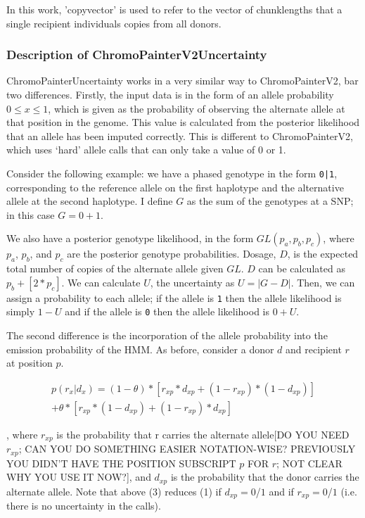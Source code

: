 In this work, 'copyvector' is used to refer to the vector of chunklengths that a single recipient individuals copies from all donors.

\subsubsection{Description of ChromoPainterV2Uncertainty}

ChromoPainterUncertainty works in a very similar way to ChromoPainterV2, bar two differences. Firstly, the input data is in the form of an allele probability $0 \leq x \leq 1$, which is given as the probability of observing the alternate allele at that position in the genome. This value is calculated from the posterior likelihood that an allele has been imputed correctly. This is different to ChromoPainterV2, which uses `hard' allele calls that can only take a value of 0 or 1.

Consider the following example: we have a phased genotype in the form \texttt{0|1}, corresponding to the reference allele on the first haplotype and the alternative allele at the second haplotype. I define $G$ as the sum of the genotypes at a SNP; in this case $G=0+1$.

We also have a posterior genotype likelihood, in the form $GL(p_{a}, p_{b}, p_{c})$, where $p_{a}$, $p_{b}$, and $p_{c}$ are the posterior genotype probabilities. Dosage, $D$, is the expected total number of copies of the alternate allele given $GL$. $D$ can be calculated as $p_{b} + [2*p_{c}]$. We can calculate $U$, the uncertainty as $U = |G-D|$. Then, we can assign a probability to each allele; if the allele is \texttt{1} then the allele likelihood is simply $1 - U$ and if the allele is \texttt{0} then the allele likelihood is $0 + U$.
                 
The second difference is the incorporation of the allele probability into the emission probability of the HMM. As before, consider a donor $d$ and recipient $r$ at position $p$.

\begin{equation}
\begin{split}
p(r_{x} | d_{x}) = (1-\theta)*[r_{xp}*d_{xp} + (1-r_{xp}) * (1-d_{xp})] \\ + \theta * [r_{xp}*(1-d_{xp}) + (1-r_{xp})*d_{xp}]
\end{split}
\end{equation}

, where  $r_{xp}$ is the probability that r carries the alternate allele{\color{red}[DO YOU NEED $r_{xp}$; CAN YOU DO SOMETHING EASIER NOTATION-WISE? PREVIOUSLY YOU DIDN'T HAVE THE POSITION SUBSCRIPT $p$ FOR $r$; NOT CLEAR WHY YOU USE IT NOW?]}, and $d_{xp}$ is the probability that the donor carries the alternate allele. Note that above (3) reduces (1) if $d_{xp} = 0$/$1$ and if $r_{xp} = 0$/$1$ (i.e. there is no uncertainty in the calls).


